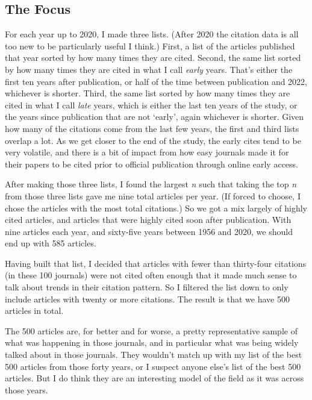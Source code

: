 \documentclass[
  10pt,
  letterpaper,
  DIV=11,
  numbers=noendperiod,
  twoside]{scrartcl}
\begin{document}
\subsection{The Focus}\label{sec-focus}

For each year up to 2020, I made three lists. (After 2020 the citation
data is all too new to be particularly useful I think.) First, a list of
the articles published that year sorted by how many times they are
cited. Second, the same list sorted by how many times they are cited in
what I call \emph{early} years. That's either the first ten years after
publication, or half of the time between publication and 2022, whichever
is shorter. Third, the same list sorted by how many times they are cited
in what I call \emph{late} years, which is either the last ten years of
the study, or the years since publication that are not `early', again
whichever is shorter. Given how many of the citations come from the last
few years, the first and third lists overlap a lot. As we get closer to
the end of the study, the early cites tend to be very volatile, and
there is a bit of impact from how easy journals made it for their papers
to be cited prior to official publication through online early access.

After making those three lists, I found the largest \emph{n} such that
taking the top \emph{n} from those three lists gave me nine total
articles per year. (If forced to choose, I chose the articles with the
most total citations.) So we got a mix largely of highly cited articles,
and articles that were highly cited soon after publication. With nine
articles each year, and sixty-five years between 1956 and 2020, we
should end up with 585 articles.

Having built that list, I decided that articles with fewer than
thirty-four citations (in these 100 journals) were not cited often
enough that it made much sense to talk about trends in their citation
pattern. So I filtered the list down to only include articles with
twenty or more citations. The result is that we have 500 articles in
total.

The 500 articles are, for better and for worse, a pretty representative
sample of what was happening in those journals, and in particular what
was being widely talked about in those journals. They wouldn't match up
with my list of the best 500 articles from those forty years, or I
suspect anyone else's list of the best 500 articles. But I do think they
are an interesting model of the field as it was across those years.
\end{document}
